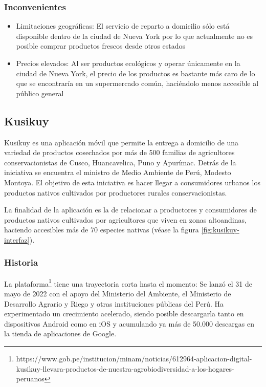 
\subsubsection{Inconvenientes}

\begin{itemize}

	\item Limitaciones geográficas: El servicio de reparto a domicilio sólo está disponible dentro de la ciudad de Nueva York por lo que actualmente no es posible comprar productos frescos desde otros estados
	
	\item Precios elevados: Al ser productos ecológicos y operar únicamente en la ciudad de Nueva York, el precio de los productos es bastante más caro de lo que se encontraría en un supermercado común, haciéndolo menos accesible al público general

\end{itemize}

\subsection{Kusikuy}

Kusikuy es una aplicación móvil que permite la entrega a domicilio de una variedad de productos cosechados por más de 500 familias de agricultores conservacionistas de Cusco, Huancavelica, Puno y Apurímac. Detrás de la iniciativa se encuentra el ministro de Medio Ambiente de Perú, Modesto Montoya. El objetivo de esta iniciativa es hacer llegar a consumidores urbanos los productos nativos cultivados por productores rurales conservacionistas.

La finalidad de la aplicación es la de relacionar a productores y consumidores de productos nativos cultivados por agricultores que viven en zonas altoandinas, haciendo accesibles más de 70 especies nativas (véase la figura \ref{fig:kusikuy-interfaz}).


\subsubsection{Historia}

La plataforma\footnote{https://www.gob.pe/institucion/minam/noticias/612964-aplicacion-digital-kusikuy-llevara-productos-de-nuestra-agrobiodiversidad-a-los-hogares-peruanos} tiene una trayectoria corta hasta el momento: Se lanzó el 31 de mayo de 2022 con el apoyo del Ministerio del Ambiente, el Ministerio de Desarrollo Agrario y Riego y otras instituciones públicas del Perú. Ha experimentado un crecimiento acelerado, siendo posible descargarla tanto en dispositivos Android como en iOS y acumulando ya más de 50.000 descargas en la tienda de aplicaciones de Google.

